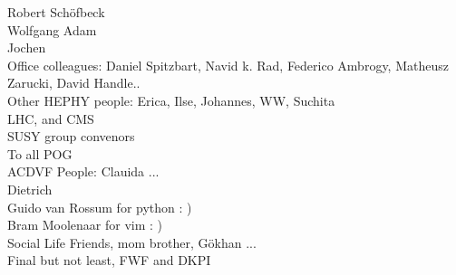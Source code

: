 \begin{acknowledgements}
Robert Sch\"{o}fbeck \\
Wolfgang Adam \\
Jochen\\
Office colleagues: Daniel Spitzbart, Navid k. Rad, Federico Ambrogy, Matheusz Zarucki, David Handle.. \\
Other HEPHY people: Erica, Ilse, Johannes, WW, Suchita \\
LHC, and CMS \\
SUSY group convenors \\
To all POG \\
ACDVF People: Clauida ... \\
Dietrich \\
Guido van Rossum for python : ) \\ 
Bram Moolenaar for vim : ) \\
Social Life Friends, mom brother, G\"{o}khan ... \\
Final but not least, FWF and DKPI \\


\end{acknowledgements}

